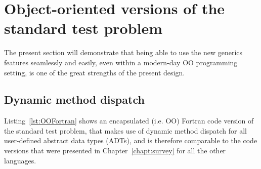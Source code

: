 \documentclass[11pt,oneside]{report}
\begin{document}


\section{Object-oriented versions of the standard test problem}

The present section will demonstrate that being able to use the new
generics features seamlessly and easily, even within a modern-day OO
programming setting, is one of the great strengths of the present
design.

\subsection{Dynamic method dispatch}
\label{sect:Fortran_dynamic_dispatch}

Listing~\ref{lst:OOFortran} shows an encapsulated (i.e. OO) Fortran
code version of the standard test problem, that makes use of dynamic
method dispatch for all user-defined abstract data types (ADTs),
and is therefore comparable to the code versions that were presented
in Chapter~\ref{chapt:survey} for all the other languages.
\end{document}
